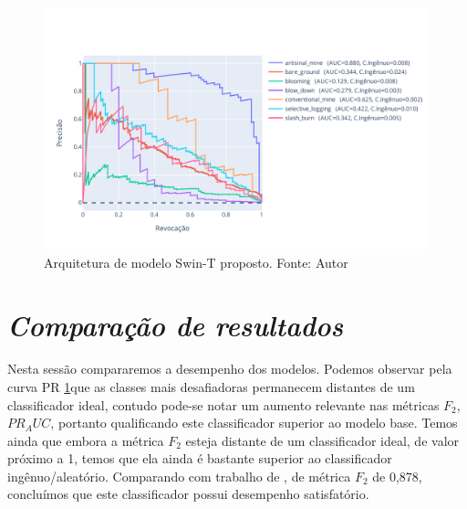 \begin{figure}[!ht]
    \centering
    \includegraphics[width=\columnwidth]{Imagens/results/rsp-swin-t_planet_pt/Curva PR para classes raras.pdf}
    \caption{ Arquitetura de modelo Swin-T proposto.
    Fonte: Autor}
    \label{fig:CurvaPRSwint}
\end{figure}       
    
\section{\textit{Comparação de resultados}}\label{sec:Cap4_Comparação de resultados}    

Nesta sessão compararemos a desempenho dos modelos. Podemos observar pela curva PR \ref{fig:CurvaPRSwint}que as classes mais desafiadoras permanecem distantes de um classificador ideal, contudo pode-se notar um aumento relevante nas métricas $F_2$, $PR_AUC$, portanto qualificando este classificador superior ao modelo base. Temos ainda que embora a métrica $F_2$ esteja distante de um classificador ideal, de valor próximo a 1, temos que ela ainda é bastante superior ao classificador ingênuo/aleatório. Comparando com trabalho de \cite{9701667}, de métrica $F_2$ de 0,878, concluímos que este classificador possui desempenho satisfatório.



